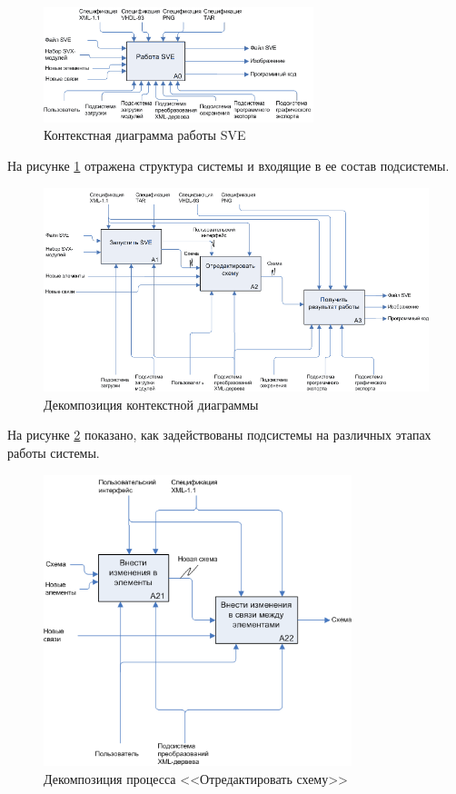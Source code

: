 \begin{figure}[H]
  \centering
  \includegraphics[width=0.7\textwidth]{diagrams/idef/a0-a.png}
  \caption{Контекстная диаграмма работы SVE}
  \label{fig:funcprot-1}
\end{figure}

На рисунке \ref{fig:funcprot-1} отражена структура системы и входящие в ее состав подсистемы.

\begin{figure}[H]
  \centering
  \includegraphics[width=1.0\textwidth]{diagrams/idef/a0-b.png}
  \caption{Декомпозиция контекстной диаграммы}
  \label{fig:funcprot-2}
\end{figure}

На рисунке \ref{fig:funcprot-2} показано, как задействованы подсистемы на различных этапах работы системы.

\begin{figure}[H]
  \centering
  \includegraphics[width=0.8\textwidth]{diagrams/idef/a2-b.png}
  \caption{Декомпозиция процесса <<Отредактировать схему>>}
  \label{fig:funcprot-3}
\end{figure}

